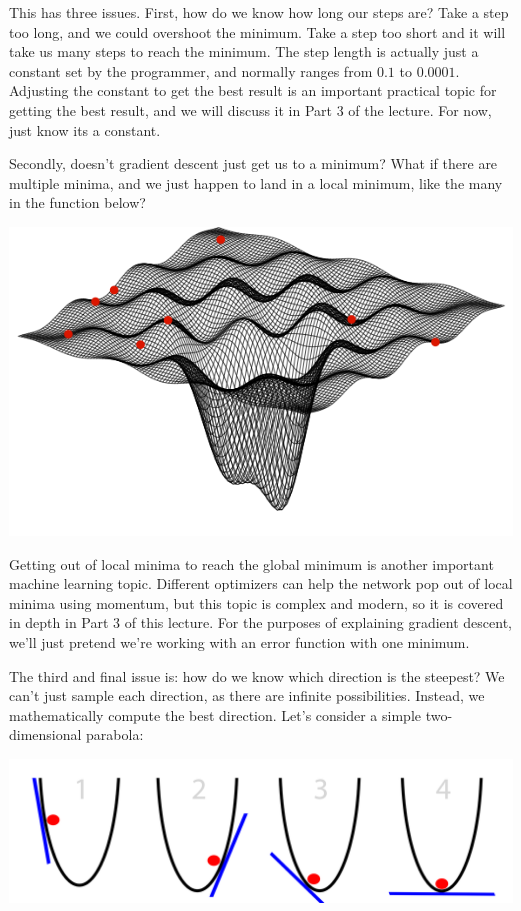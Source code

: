 \documentclass{article}
\begin{document}
This has three issues. First, how do we know how long our steps are? Take a step too long, and we could overshoot the minimum. Take a step too short and it will take us many steps to reach the minimum. The step length is actually just a constant set by the programmer, and normally ranges from $0.1$ to $0.0001$. Adjusting the constant to get the best result is an important practical topic for getting the best result, and we will discuss it in Part 3 of the lecture. For now, just know its a constant.

Secondly, doesn't gradient descent just get us to a minimum? What if there are multiple minima, and we just happen to land in a local minimum, like the many in the function below?
\begin{center}
\includegraphics[scale=0.9]{minima}
\end{center}

Getting out of local minima to reach the global minimum is another important machine learning topic. Different optimizers can help the network pop out of local minima using momentum, but this topic is complex and modern, so it is covered in depth in Part 3 of this lecture. For the purposes of explaining gradient descent, we'll just pretend we're working with an error function with one minimum.

The third and final issue is: how do we know which direction is the steepest? We can't just sample each direction, as there are infinite possibilities. Instead, we mathematically compute the best direction. Let's consider a simple two-dimensional parabola:

\begin{center}
\includegraphics[scale=0.7]{sgd_optimal}
\end{center}
\end{document}
